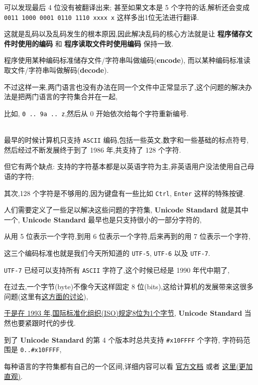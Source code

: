 \documentclass[11pt]{article}
\begin{document}
可以发现最后 4 位没有被翻译出来; 甚至如果文本是 5 个字符的话,解析还会变成 \texttt{0011 1000 0001 0110 1110 xxxx x} 这样多出1位无法进行翻译.

这就是乱码以及乱码发生的根本原因,因此解决乱码的核心方法就是让 \textbf{程序储存文件时使用的编码} 和 \textbf{程序读取文件时使用编码} 保持一致.

程序使用某种编码标准储存文件/字符串叫做编码(\textbf{encode}), 而以某种编码标准读取文件/字符串叫做解码(\textbf{decode}).

不过这样一来,两门语言也没有办法在同一个文件中正常显示了,这个问题的解决办法是把两门语言的字符集合并在一起,

比如, \texttt{0 .. 9a .. z},然后从 0 开始依次给每个字符重新编号.

\\[0pt]

最早的时候计算机只支持 \texttt{ASCII} 编码,包括一些英文,数字和一些基础的标点符号,然后经过不断发展终于到了 1986 年,共支持了 128 个字符.

但它有两个缺点: 支持的字符基本都是以英语字符为主,非英语用户没法使用自己母语的字符;

其次,128 个字符是不够用的,因为键盘有一些比如 \texttt{Ctrl}, \texttt{Enter} 这样的特殊按键.

人们需要定义了一些足以解决这些问题的字符集, \textbf{Unicode Standard} 就是其中一个, \textbf{Unicode Standard} 最早也是只支持很小的一部分字符的,

从用 5 位表示一个字符,到用 6 位表示一个字符,后来再到的用 7 位表示一个字符,

这三个编码标准也就是我们今天所知道的 \texttt{UTF-5}, \texttt{UTF-6} 以及 \texttt{UTF-7}.

\texttt{UTF-7} 已经可以支持所有 \texttt{ASCII} 字符了,这个时候已经是 1990 年代中期了,

在过去,一个字节(byte)不像今天这样固定 8 位(bits),这给计算机的发展带来这很多问题(这里有\href{https://softwareengineering.stackexchange.com/questions/120126/what-is-the-history-of-why-bytes-are-eight-bits}{这方面的讨论}),

\href{https://www.iso.org/obp/ui/\#iso:std:iso-iec:2382:-1:ed-3:v1:en}{于是在 1993 年,国际标准化组织(ISO)规定8位为1个字节}, \textbf{Unicode Standard} 当然也要紧跟时代的步伐.

到了 \textbf{Unicode Standard} 的第 4 个版本时总共支持 \texttt{\#x10FFFF} 个字符, 字符码范围是 \texttt{0..\#x10FFFF},

每种语言的字符集都有自己的一个区间,详细内容可以看 \href{http://www.unicode.org/charts/}{官方文档} 或者 \href{https://unicode-table.com/en/}{这里(更加直观)}.
\end{document}
